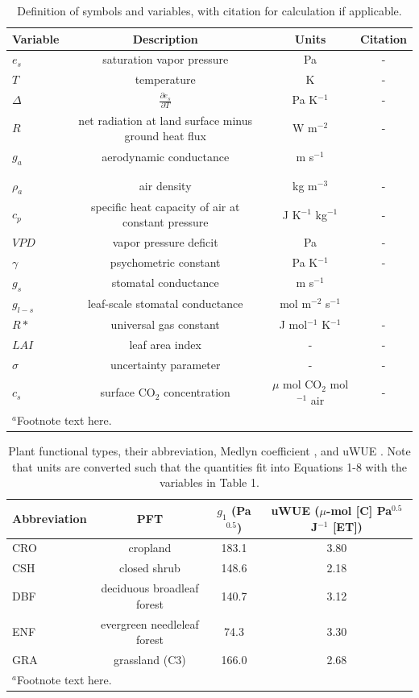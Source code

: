 \documentclass[draft,linenumbers]{gcbjournal}
\begin{document}
\begin{table}
\caption{Definition of symbols and variables, with citation for calculation if applicable.}
\centering
\begin{tabular}{l c c c}
\hline
 Variable & Description & Units & Citation \\
\hline
$e_s$  & saturation vapor pressure & Pa  & - \\ 
$T$  & temperature  & K & - \\
$\Delta$  & $\frac{\partial e_s}{\partial T}$ & Pa K$^{-1}$ & - \\
$R$  & net radiation at land surface minus ground heat flux & W m$^{-2}$   & - \\
  $g_a$  & aerodynamic conductance & m s$^{-1}$  & \makecell{\cite{Thom_1977} \\ \cite{Paulson_1970} \\ \cite{Beljaars_1991}} \\
  $\rho_a$  & air density & kg m$^{-3}$  & - \\
  $c_p$  & specific heat capacity of air at constant pressure & J K$^{-1}$ kg$^{-1}$ & - \\
  $VPD$  & vapor pressure deficit & Pa  & - \\
  $\gamma$  & psychometric constant & Pa K$^{-1}$   & - \\
  $g_s$  & stomatal conductance & m s$^{-1}$  & \cite{MEDLYN_2011} \\
  $g_{l-s}$  & leaf-scale stomatal conductance & mol m$^{-2}$ s$^{-1}$  & \cite{MEDLYN_2011} \\
  $R*$ & universal gas constant & J mol$^{-1}$ K$^{-1}$ & - \\
  $LAI$ & leaf area index & -& - \\
  $\sigma$ & uncertainty parameter & -& - \\
  $c_s$ & surface CO$_2$ concentration & $\mu$ mol CO$_2$ mol$^{-1}$ air& - \\
\hline
\multicolumn{2}{l}{$^{a}$Footnote text here.}
\end{tabular}
\end{table}

\begin{table}
  \label{pft}
\caption{Plant functional types, their abbreviation, Medlyn coefficient \citep[from ][]{Lin_2015}, and uWUE \citep[from ][]{Zhou_2015}. Note that units are converted such that the quantities fit into Equations 1-8 with the variables in Table 1.}
\centering
\begin{tabular}{l c c c}
  \hline
  Abbreviation & PFT & $g_1$ (Pa$^{0.5}$) & uWUE ($\mu$-mol [C] Pa$^{0.5}$ J$^{-1}$ [ET])  \\
  \hline
  CRO & cropland & 183.1 & 3.80 \\
  CSH & closed shrub & 148.6 & 2.18 \\
  DBF & deciduous broadleaf forest & 140.7 & 3.12 \\
  ENF & evergreen needleleaf forest & 74.3 & 3.30 \\
  GRA & grassland (C3) & 166.0 & 2.68 \\
\hline
\multicolumn{2}{l}{$^{a}$Footnote text here.}
\end{tabular}
\end{table}
\end{document}
